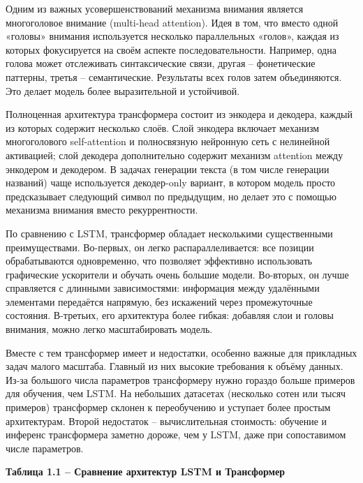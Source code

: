 Одним из важных усовершенствований механизма внимания является многоголовое внимание (multi-head attention). Идея в том, что вместо одной «головы» внимания используется несколько параллельных «голов», каждая из которых фокусируется на своём аспекте последовательности. Например, одна голова может отслеживать синтаксические связи, другая -- фонетические паттерны, третья -- семантические. Результаты всех голов затем объединяются. Это делает модель более выразительной и устойчивой.

Полноценная архитектура трансформера состоит из энкодера и декодера, каждый из которых содержит несколько слоёв. Слой энкодера включает механизм многоголового self-attention и полносвязную нейронную сеть с нелинейной активацией; слой декодера дополнительно содержит механизм attention между энкодером и декодером. В задачах генерации текста (в том числе генерации названий) чаще используется декодер-only вариант, в котором модель просто предсказывает следующий символ по предыдущим, но делает это с помощью механизма внимания вместо рекуррентности.

По сравнению с LSTM, трансформер обладает несколькими существенными преимуществами. Во-первых, он легко распараллеливается: все позиции обрабатываются одновременно, что позволяет эффективно использовать графические ускорители и обучать очень большие модели. Во-вторых, он лучше справляется с длинными зависимостями: информация между удалёнными элементами передаётся напрямую, без искажений через промежуточные состояния. В-третьих, его архитектура более гибкая: добавляя слои и головы внимания, можно легко масштабировать модель.

Вместе с тем трансформер имеет и недостатки, особенно важные для прикладных задач малого масштаба. Главный из них высокие требования к объёму данных. Из-за большого числа параметров трансформеру нужно гораздо больше примеров для обучения, чем LSTM. На небольших датасетах (несколько сотен или тысяч примеров) трансформер склонен к переобучению и уступает более простым архитектурам. Второй недостаток -- вычислительная стоимость: обучение и инференс трансформера заметно дороже, чем у LSTM, даже при сопоставимом числе параметров.

\textbf{Таблица 1.1 -- Сравнение архитектур LSTM и Трансформер}


